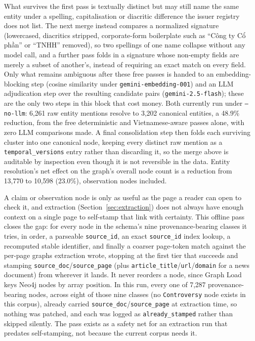 \documentclass[fontsize=12pt,oneside,headings=small]{scrreprt}
\begin{document}
What survives the first pass is textually distinct but may still name the same entity under a spelling, capitalisation or diacritic difference the issuer registry does not list. The next merge instead compares a normalized signature (lowercased, diacritics stripped, corporate-form boilerplate such as ``Công ty Cổ phần'' or ``TNHH'' removed), so two spellings of one name collapse without any model call, and a further pass folds in a signature whose non-empty fields are merely a subset of another's, instead of requiring an exact match on every field. Only what remains ambiguous after these free passes is handed to an embedding-blocking step (cosine similarity under \texttt{gemini-embedding-001}) and an LLM adjudication step over the resulting candidate pairs (\texttt{gemini-2.5-flash}); these are the only two steps in this block that cost money. Both currently run under \texttt{--no-llm}: 6{,}261 raw entity mentions resolve to 3{,}202 canonical entities, a 48.9\% reduction, from the free deterministic and Vietnamese-aware passes alone, with zero LLM comparisons made. A final consolidation step then folds each surviving cluster into one canonical node, keeping every distinct raw mention as a \texttt{temporal\_versions} entry rather than discarding it, so the merge above is auditable by inspection even though it is not reversible in the data. Entity resolution's net effect on the graph's overall node count is a reduction from 13{,}770 to 10{,}598 (23.0\%), observation nodes included.

A claim or observation node is only as useful as the page a reader can open to check it, and extraction (Section~\ref{sec:extraction}) does not always have enough context on a single page to self-stamp that link with certainty. This offline pass closes the gap: for every node in the schema's nine provenance-bearing classes it tries, in order, a parseable \texttt{source\_id}, an exact \texttt{source\_id} index lookup, a recomputed stable identifier, and finally a coarser page-token match against the per-page graphs extraction wrote, stopping at the first tier that succeeds and stamping \texttt{source\_doc}/\texttt{source\_page} (plus \texttt{article\_title}/\texttt{url}/\texttt{domain} for a news document) from wherever it lands. It never reorders a node, since Graph Load keys Neo4j nodes by array position. In this run, every one of 7{,}287 provenance-bearing nodes, across eight of those nine classes (no \texttt{Controversy} node exists in this corpus), already carried \texttt{source\_doc}/\texttt{source\_page} at extraction time, so nothing was patched, and each was logged as \texttt{already\_stamped} rather than skipped silently. The pass exists as a safety net for an extraction run that predates self-stamping, not because the current corpus needs it.
\end{document}
